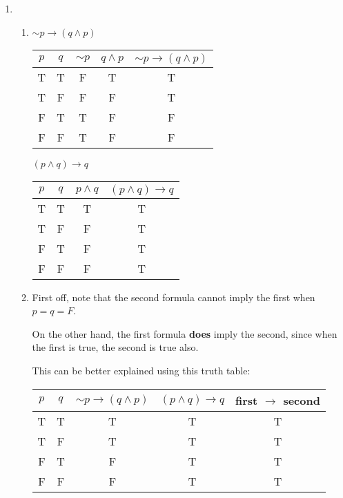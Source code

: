 
\begin{enumerate}
\item
    \begin{enumerate}
    \item 
        $\sim p \rightarrow (q \wedge p)$

        \begin{tabular}{c|c|c|c|c}
        $p$ & $q$ & $\sim p$ & $q \wedge p$ & $\sim p \rightarrow (q \wedge p)$ \\
        \hline
        T & T & F & T & T \\
        T & F & F & F & T \\
        F & T & T & F & F \\
        F & F & T & F & F \\
        \end{tabular}

        \vspace{3mm}

        $(p \wedge q) \rightarrow q$

        \begin{tabular}{c|c|c|c}
        $p$ & $q$ & $p \wedge q$ & $(p \wedge q) \rightarrow q$ \\
        \hline
        T & T & T & T \\
        T & F & F & T \\
        F & T & F & T \\
        F & F & F & T \\
        \end{tabular}

    \item
        First off, note that the second formula cannot imply the first
        when $p = q = F$.

        On the other hand, the first formula \textbf{does} imply the
        second, since when the first is true, the second is true also.

        This can be better explained using this truth table:

        \begin{tabular}{c|c|c|c|c}
        $p$ & $q$ & $\sim p \rightarrow (q \wedge p)$ &
            $(p \wedge q) \rightarrow q$ & first $\rightarrow$ second \\
        \hline
        T & T & T & T & T \\
        T & F & T & T & T \\
        F & T & F & T & T \\
        F & F & F & T & T \\
        \end{tabular}


\end{enumerate}
\end{enumerate}
